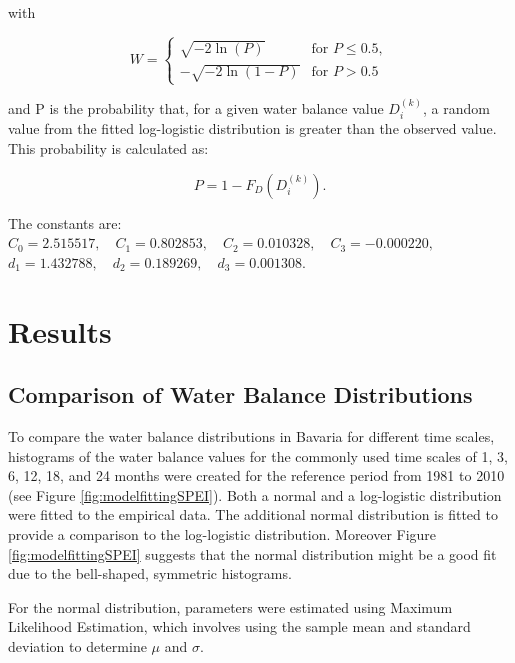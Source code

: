 \documentclass[
]{krantz}
\begin{document}
with

\begin{equation}
W = \begin{cases}
\sqrt{-2\ln(P)} & \text{for } P \le 0.5, \\
-\sqrt{-2\ln(1-P)} & \text{for } P > 0.5
\end{cases}
\end{equation}

and P is the probability that, for a given water balance value \(D^{(k)}_i\), a random value from the fitted log-logistic distribution is greater than the observed value. This probability is calculated as:

\begin{equation}
P = 1 - F_D(D^{(k)}_i).
\end{equation}

The constants are:
\(C_0 = 2.515517, \quad C_1 = 0.802853, \quad C_2 = 0.010328, \quad C_3 = -0.000220,\) \(d_1 = 1.432788, \quad d_2 = 0.189269, \quad d_3 = 0.001308\). \citet{vicente}

\section{Results}\label{results}

\subsection{Comparison of Water Balance Distributions}\label{comparison-of-water-balance-distributions}

To compare the water balance distributions in Bavaria for different time scales, histograms of the water balance values for the commonly used time scales of 1, 3, 6, 12, 18, and 24 months were created for the reference period from 1981 to 2010 (see Figure \ref{fig:modelfittingSPEI}). Both a normal and a log-logistic distribution were fitted to the empirical data. The additional normal distribution is fitted to provide a comparison to the log-logistic distribution. Moreover Figure \ref{fig:modelfittingSPEI} suggests that the normal distribution might be a good fit due to the bell-shaped, symmetric histograms.

For the normal distribution, parameters were estimated using Maximum Likelihood Estimation, which involves using the sample mean and standard deviation to determine \(\mu\) and \(\sigma\).
\end{document}
